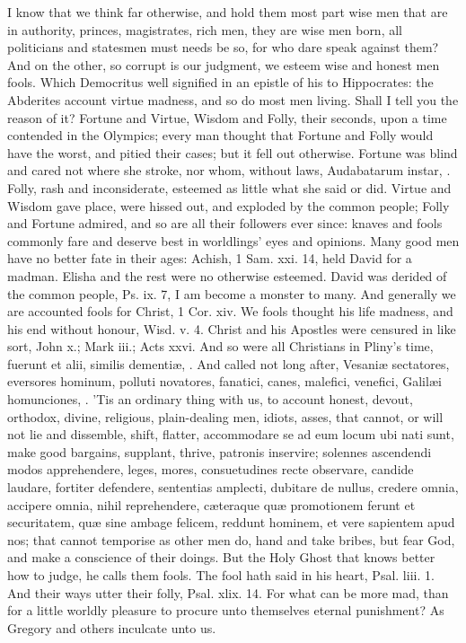 {I know that we think far otherwise, and hold them most part wise men
that are in authority, princes, magistrates, rich men, they are
wise men born, all politicians and statesmen must needs be so, for who
dare speak against them? And on the other, so corrupt is our judgment,
we esteem wise and honest men fools. Which Democritus well signified in
an epistle of his to Hippocrates: the Abderites account virtue
madness, and so do most men living. Shall I tell you the reason of it?
Fortune and Virtue, Wisdom and Folly, their seconds, upon a time
contended in the Olympics; every man thought that Fortune and Folly
would have the worst, and pitied their cases; but it fell out
otherwise. Fortune was blind and cared not where she stroke, nor whom,
without laws, Audabatarum instar, \etc. Folly, rash and inconsiderate,
esteemed as little what she said or did. Virtue and Wisdom gave
place, were hissed out, and exploded by the common people; Folly
and Fortune admired, and so are all their followers ever since: knaves
and fools commonly fare and deserve best in worldlings' eyes and
opinions. Many good men have no better fate in their ages: Achish, 1
Sam. xxi. 14, held David for a madman. Elisha and the rest were no
otherwise esteemed. David was derided of the common people, Ps. ix. 7,
I am become a monster to many. And generally we are accounted fools for
Christ, 1 Cor. xiv. We fools thought his life madness, and his end
without honour, Wisd. v. 4. Christ and his Apostles were censured in
like sort, John x.; Mark iii.; Acts xxvi. And so were all Christians in
Pliny's time, fuerunt et alii, similis dementi\ae{}, \etc. And called
not long after, Vesani\ae{} sectatores, eversores hominum, polluti
novatores, fanatici, canes, malefici, venefici, Galil\ae{}i homunciones,
\etc. 'Tis an ordinary thing with us, to account honest, devout,
orthodox, divine, religious, plain-dealing men, idiots, asses, that
cannot, or will not lie and dissemble, shift, flatter, accommodare se
ad eum locum ubi nati sunt, make good bargains, supplant, thrive,
patronis inservire; solennes ascendendi modos apprehendere, leges,
mores, consuetudines recte observare, candide laudare, fortiter
defendere, sententias amplecti, dubitare de nullus, credere omnia,
accipere omnia, nihil reprehendere, c\ae{}teraque qu\ae{} promotionem ferunt
et securitatem, qu\ae{} sine ambage felicem, reddunt hominem, et vere
sapientem apud nos; that cannot temporise as other men do, hand
and take bribes, \etc but fear God, and make a conscience of their
doings. But the Holy Ghost that knows better how to judge, he calls
them fools. The fool hath said in his heart, Psal. liii. 1. And their
ways utter their folly, Psal. xlix. 14. For what can be more mad,
than for a little worldly pleasure to procure unto themselves eternal
punishment? As Gregory and others inculcate unto us.

}
